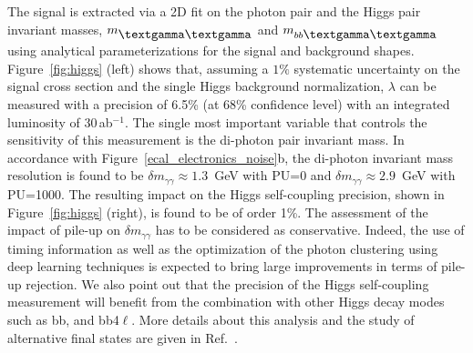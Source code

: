 \documentclass[11pt,twoside,a4paper]{cernrep}
\begin{document}
The signal is extracted via a 2D fit on the photon pair and the Higgs pair invariant masses, $m_{\mbox{\textgamma\textgamma}}$ and $m_{b b\rm \mbox{\textgamma\textgamma}}$ using analytical parameterizations for the signal and background shapes. Figure~\ref{fig:higgs} (left) shows that, assuming a $1\%$ systematic uncertainty on the signal cross section and the single Higgs background normalization, $\lambda$ can be measured with a precision of 6.5\% (at 68\% confidence level) with an integrated luminosity of 30\,ab$^{-1}$. The single most important variable that controls the sensitivity of this measurement is the di-photon pair invariant mass.
In accordance with Figure~\ref{ecal_electronics_noise}b, the di-photon invariant mass resolution is found to be $\delta m_{\gamma\gamma}\approx 1.3$~GeV with PU=0 and $\delta m_{\gamma\gamma}\approx 2.9$~GeV with PU=1000. The resulting impact on the Higgs self-coupling precision, shown in Figure~\ref{fig:higgs} (right), is found to be of order 1\%. The assessment of the impact of pile-up on $\delta m_{\gamma\gamma}$ has to be considered as conservative. Indeed, the use of timing information as well as the optimization of the photon clustering using deep learning techniques is expected to bring large improvements in terms of pile-up rejection. We also point out that the precision of the Higgs self-coupling measurement will benefit from the combination with other Higgs decay modes such as bb\texttau\texttau, and bb4$\ell$. More details about this analysis and the study of alternative final states are given in Ref.~\cite{Selvaggi:2642471}.
%
\end{document}
